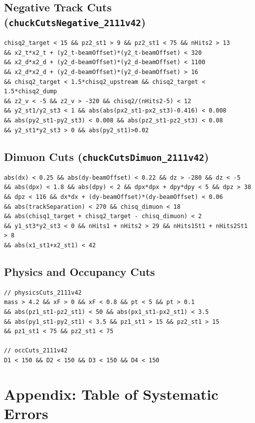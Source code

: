 \documentclass[11pt]{article}
\begin{document}
\subsection{Negative Track Cuts (\texttt{chuckCutsNegative\_2111v42})}
\label{cut:chuck_negative}
{\small\begin{verbatim}
chisq2_target < 15 && pz2_st1 > 9 && pz2_st1 < 75 && nHits2 > 13
&& x2_t*x2_t + (y2_t-beamOffset)*(y2_t-beamOffset) < 320
&& x2_d*x2_d + (y2_d-beamOffset)*(y2_d-beamOffset) < 1100
&& x2_d*x2_d + (y2_d-beamOffset)*(y2_d-beamOffset) > 16
&& chisq2_target < 1.5*chisq2_upstream && chisq2_target < 1.5*chisq2_dump
&& z2_v < -5 && z2_v > -320 && chisq2/(nHits2-5) < 12
&& y2_st1/y2_st3 < 1 && abs(abs(px2_st1-px2_st3)-0.416) < 0.008
&& abs(py2_st1-py2_st3) < 0.008 && abs(pz2_st1-pz2_st3) < 0.08
&& y2_st1*y2_st3 > 0 && abs(py2_st1)>0.02
\end{verbatim}}

\subsection{Dimuon Cuts (\texttt{chuckCutsDimuon\_2111v42})}
\label{cut:chuck_dimuon}
{\small\begin{verbatim}
abs(dx) < 0.25 && abs(dy-beamOffset) < 0.22 && dz > -280 && dz < -5
&& abs(dpx) < 1.8 && abs(dpy) < 2 && dpx*dpx + dpy*dpy < 5 && dpz > 38
&& dpz < 116 && dx*dx + (dy-beamOffset)*(dy-beamOffset) < 0.06
&& abs(trackSeparation) < 270 && chisq_dimuon < 18
&& abs(chisq1_target + chisq2_target - chisq_dimuon) < 2
&& y1_st3*y2_st3 < 0 && nHits1 + nHits2 > 29 && nHits1St1 + nHits2St1 > 8
&& abs(x1_st1+x2_st1) < 42
\end{verbatim}}

\subsection{Physics and Occupancy Cuts}
\label{cut:physics_occ}
{\small\begin{verbatim}
// physicsCuts_2111v42
mass > 4.2 && xF > 0 && xF < 0.8 && pt < 5 && pt > 0.1
&& abs(pz1_st1-pz2_st1) < 50 && abs(px1_st1-px2_st1) < 3.5
&& abs(py1_st1-py2_st1) < 3.5 && pz1_st1 > 15 && pz2_st1 > 15
&& pz1_st1 < 75 && pz2_st1 < 75

// occCuts_2111v42
D1 < 150 && D2 < 150 && D3 < 150 && D4 < 150
\end{verbatim}}

\clearpage
\section{Appendix: Table of Systematic Errors}
\label{app:systematics_table}
\end{document}
